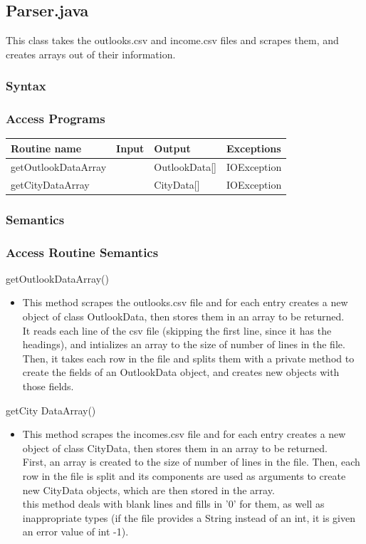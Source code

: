 \documentclass[12pt,fleqn]{article}
\begin{document}

\subsection*{Parser.java}\label{p
arser}
This class takes the outlooks.csv and income.csv files and scrapes them, and creates arrays out of their information.
\subsubsection* {Syntax}

\subsubsection* {Access Programs}
\begin{tabular}{| l | l | l | l |}
\hline
\textbf{Routine name} & \textbf{Input} & \textbf{Output} & \textbf{Exceptions}\\
\hline
getOutlookDataArray & ~ & OutlookData[] & IOException\\
\hline
getCityDataArray & ~ & CityData[] & IOException\\
\hline
\end{tabular}

\subsubsection*{Semantics}
\subsubsection*{Access Routine Semantics}
\noindent getOutlookDataArray()
\begin{itemize}
\item This method scrapes the outlooks.csv file and for each entry creates a new object of class OutlookData, then stores them in an array to be returned.
\\It reads each line of the csv file (skipping the first line, since it has the headings), and intializes an array to the size of number of lines in the file. Then, it takes each row in the file and splits them with a private method to create the fields of an OutlookData object, and creates new objects with those fields.
\end{itemize}
\noindent getCity DataArray()
\begin{itemize}
\item This method scrapes the incomes.csv file and for each entry creates a new object of class CityData, then stores them in an array to be returned.
\\First, an array is created to the size of number of lines in the file. Then, each row in the file is split and its components are used as arguments to create new CityData objects, which are then stored in the array.
\\this method deals with blank lines and fills in '0' for them, as well as inappropriate types (if the file provides a String instead of an int, it is given an error value of int -1).
\end{itemize}
\end{document}
